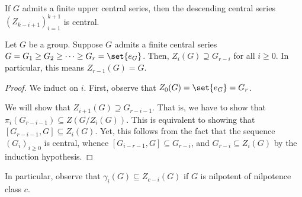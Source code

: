 \documentclass[10pt]{mypackage}
\begin{document}
If $G$ admits a finite upper central series, then the descending central series $\left( Z_{k-i+1} \right)_{i=1}^{k+1}$ is central.
\begin{lemma}
  Let $G$ be a group. Suppose $G$ admits a finite central series $G = G_1\geq G_2\geq\cdots\geq G_r = \set{e_G}$. Then, $Z_i(G)\supseteq G_{r-i}$ for all $i\geq 0$. In particular, this means $Z_{r-1}(G) = G$.
\end{lemma}
\begin{proof}
  We induct on $i$. First, observe that $Z_0(G) = \set{e_G} = G_r$.

  We will show that $Z_{i+1}(G)\supseteq G_{r-i-1}$. That is, we have to show that $\pi_i\left( G_{r-i-1} \right)\subseteq Z\left( G/Z_i(G) \right)$. This is equivalent to showing that $\left[ G_{r-i-1},G \right]\subseteq Z_i(G)$. Yet, this follows from the fact that the sequence $\left( G_i \right)_{i\geq 0}$ is central, whence $\left[ G_{i-r-1},G \right]\subseteq G_{r-i}$, and $G_{r-i}\subseteq Z_i(G)$ by the induction hypothesis.
\end{proof}
In particular, observe that $\gamma_i(G)\subseteq Z_{c-i}(G)$ if $G$ is nilpotent of nilpotence class $c$.
\end{document}
